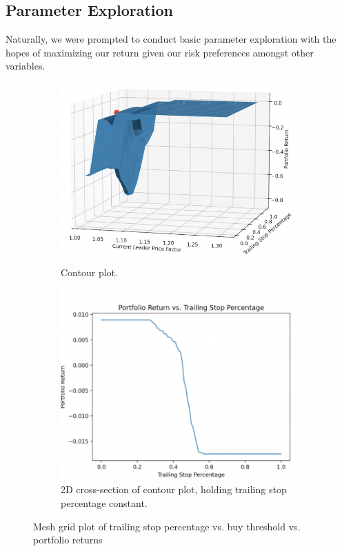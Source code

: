 \documentclass{article}
\begin{document}
\subsection{Parameter Exploration}
Naturally, we were prompted to conduct basic parameter exploration with the hopes of maximizing our return given our risk preferences amongst other variables.
\begin{figure}[H]
    \centering
    \begin{subfigure}{0.495\textwidth}
        \centering
        \includegraphics[width=\linewidth]{contourPlot.png}
        \caption{Contour plot.}
        \label{fig:contourPlot}
    \end{subfigure}
    \hfill
    \begin{subfigure}{0.495\textwidth}
        \centering
        \includegraphics[width=\linewidth]{slicePlot.png}
        \caption{2D cross-section of contour plot, holding trailing stop percentage constant.}
        \label{fig:slicePlot}
    \end{subfigure}
    \caption{Mesh grid plot of trailing stop percentage vs. buy threshold vs. portfolio returns}
    \label{fig:parameters}
\end{figure}
\end{document}
